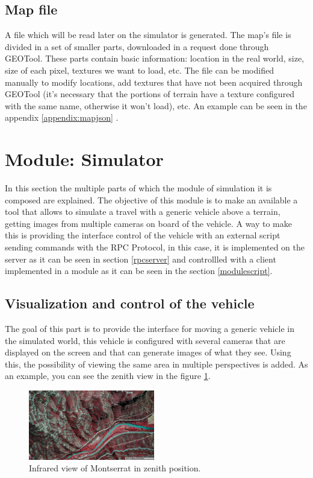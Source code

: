 \documentclass[10pt,a4paper,twocolumn,twoside]{article}
\begin{document}
\subsection{Map file}
 
A file which will be read later on the simulator is generated.  The map's file is divided in a set of smaller parts, downloaded in a request done through GEOTool. These parts contain basic information: location in the real world, size, size of each pixel, textures we want to load, etc. The file can be modified manually to modify locations, add textures that have not been acquired through GEOTool (it's necessary that the portions of terrain have a texture configured with the same name, otherwise it won't load), etc. An example can be seen in the appendix \ref{appendix:mapjson} .

\section{Module: Simulator}

In this section the multiple parts of which the module of simulation it is composed are explained. The objective of this module is to make an available a tool that allows to simulate a travel with a generic vehicle above a terrain, getting images from multiple cameras on board of the vehicle. A way to make this is providing the interface control of the vehicle with an external script sending commands with the RPC Protocol, in this case, it is implemented on the server as it can be seen in section \ref{rpcserver} and controllled with a client implemented in a module as it can be seen in the section \ref{modulescript}.

\subsection{Visualization and control of the vehicle}

The goal of this part is to provide the interface for moving a generic vehicle in the simulated world, this vehicle is configured with several cameras that are displayed on the screen and that can generate images of what they see. Using this, the possibility of viewing the same area in multiple perspectives is added. As an example, you can see the zenith view in the figure \ref{fig-montserratir}.

\begin{figure}[!h]
\centering
  	\includegraphics[width=0.49\textwidth]{cenitalviewir}
	\caption{Infrared view of Montserrat in zenith position.}
	\label{fig-montserratir}
\end{figure}
\end{document}

